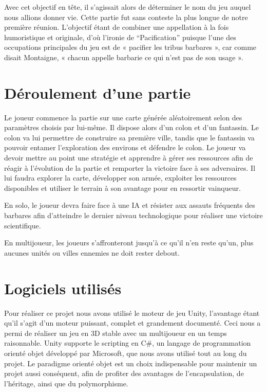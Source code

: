 \documentclass[12pt]{report}
\begin{document}
Avec cet objectif en tête, il s’agissait alors de déterminer le nom  du jeu
auquel nous allions donner vie. Cette partie fut sans conteste la plus longue de
notre première réunion. L’objectif étant de combiner une appellation à la fois
humoristique et originale, d’où l’ironie de “Pacification” puisque l’une des
occupations principales du jeu est de « pacifier les tribus barbares », car
comme disait Montaigne, « chacun appelle barbarie ce qui n’est pas de son usage
».

\section{Déroulement d’une partie}

Le joueur commence la partie sur une carte générée aléatoirement selon des
paramètres choisis par lui-même. Il dispose alors d’un colon et d’un fantassin.
Le colon va lui permettre de construire sa première ville, tandis que le
fantassin va pouvoir entamer l’exploration des environs et défendre le colon. Le
joueur va devoir mettre au point une stratégie et apprendre à gérer ses
ressources afin de réagir à l’évolution de la partie et remporter la victoire
face à ses adversaires. Il lui faudra explorer la carte, développer son armée,
exploiter les ressources disponibles et utiliser le terrain à son avantage pour
en ressortir vainqueur.

En solo, le joueur devra faire face à une IA et résister aux assauts fréquents
des barbares afin d’atteindre le dernier niveau technologique pour réaliser une
victoire scientifique.

En multijoueur, les joueurs s’affronteront jusqu’à ce qu’il n’en reste qu’un,
plus aucunes unités ou villes ennemies ne doit rester debout.

\section{Logiciels utilisés}

Pour réaliser ce projet nous avons utilisé le moteur de jeu Unity, l’avantage
étant qu’il s’agit d’un moteur puissant, complet et grandement documenté. Ceci
nous a permi de réaliser un jeu en 3D stable avec un multijoueur en un temps
raisonnable. Unity supporte le scripting en C\#, un langage de programmation
orienté objet développé par Microsoft, que nous avons utilisé tout au long du
projet. Le paradigme orienté objet est un choix indispensable pour maintenir un
projet aussi conséquent, afin de profiter des avantages de l’encapsulation, de
l’héritage, ainsi que du polymorphisme.
\end{document}
